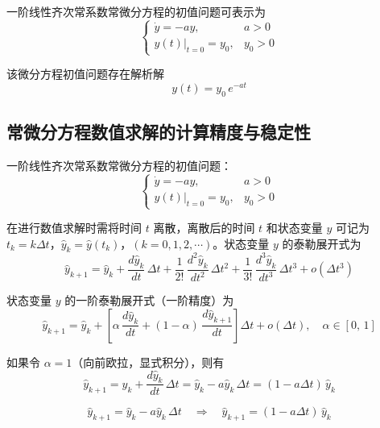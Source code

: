 一阶线性齐次常系数常微分方程的初值问题可表示为
\begin{equation}
\begin{cases}
\dot{y} = -ay, & a > 0 \\[4pt]
y(t)\big|_{t=0} = y_0, & y_0 > 0
\end{cases}
\end{equation}

该微分方程初值问题存在解析解
\begin{equation}
y(t) = y_0\, e^{-at}
\end{equation}


\subsection{常微分方程数值求解的计算精度与稳定性}

一阶线性齐次常系数常微分方程的初值问题：
\begin{equation}
\begin{cases}
\dot{y} = -ay, & a > 0 \\[4pt]
y(t)\big|_{t=0} = y_0, & y_0 > 0
\end{cases}
\end{equation}

在进行数值求解时需将时间 $t$ 离散，离散后的时间 $t$ 和状态变量 $y$ 可记为 $t_k = k\Delta t$，$\hat{y}_k = \hat{y}(t_k)$，$(k = 0, 1, 2, \cdots)$。状态变量 $y$ 的泰勒展开式为
\begin{equation}
\hat{y}_{k+1} = \hat{y}_k + \frac{d\hat{y}_k}{dt}\, \Delta t + \frac{1}{2!}\, \frac{d^2\hat{y}_k}{dt^2}\, \Delta t^2 + \frac{1}{3!}\, \frac{d^3\hat{y}_k}{dt^3}\, \Delta t^3 + o(\Delta t^3)
\end{equation}

状态变量 $y$ 的一阶泰勒展开式（一阶精度）为
\begin{equation}\label{eq:3.general_one_step}
\hat{y}_{k+1} = \hat{y}_k + \left[\alpha\, \frac{d\hat{y}_k}{dt} + (1 - \alpha)\, \frac{d\hat{y}_{k+1}}{dt}\right] \Delta t + o(\Delta t), \quad \alpha \in [0,\, 1]
\end{equation}

如果令 $\alpha = 1$（向前欧拉，显式积分），则有
\begin{equation}
\hat{y}_{k+1} = \hat{y}_k + \frac{d\hat{y}_k}{dt}\, \Delta t = \hat{y}_k - a\hat{y}_k\, \Delta t = (1 - a\Delta t)\, \hat{y}_k
\end{equation}

\begin{myformula}
\begin{equation}\label{eq:3.forward_euler}
\hat{y}_{k+1} = \hat{y}_k - a\hat{y}_k\, \Delta t \quad \Rightarrow \quad \hat{y}_{k+1} = (1 - a\Delta t)\, \hat{y}_k
\end{equation}
\end{myformula}

